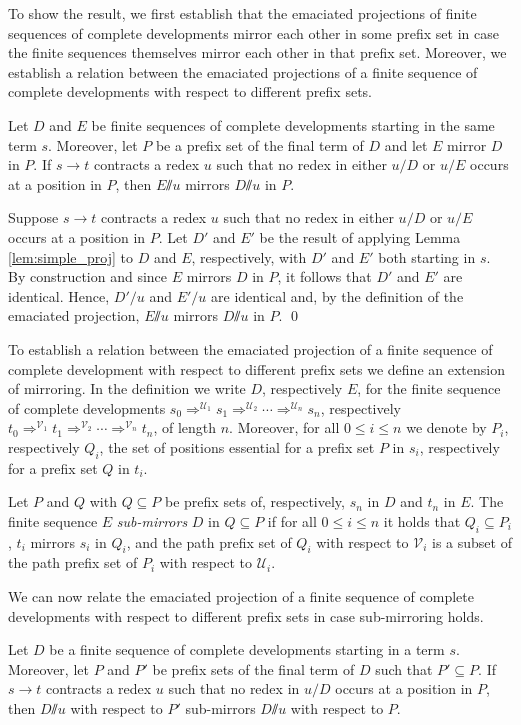 \documentclass{LMCS}
\theoremstyle{definition}
\newcommand{\rew}{\rightarrow}
\newcommand{\emmy}{\mathord{\sslash}}
\newcommand{\dev}{\Rightarrow}
\newcommand{\fscd}[3]{{#1}_0 \dev^{\mathcal{#2}_1} {#1}_1 \dev^{\mathcal{#2}_2} \cdots \dev^{\mathcal{#2}_{#3}} {#1}_{#3}}
\begin{document}
To show the result, we first establish that the emaciated projections of finite sequences of complete developments mirror each other in some prefix set in case the finite sequences themselves mirror each other in that prefix set. Moreover, we establish a relation between the emaciated projections of a finite sequence of complete developments with respect to different prefix sets.

\begin{lem}
\label{lem:nf_mirror}
Let $D$ and $E$ be finite sequences of complete developments starting in the same term $s$. Moreover, let $P$ be a prefix set of the final term of $D$ and let $E$ mirror $D$ in $P$. If $s \rew t$ contracts a redex $u$ such that no redex in either $u / D$ or $u / E$ occurs at a position in $P$, then $E \emmy u$ mirrors $D \emmy u$ in $P$.
\end{lem}

\proof
Suppose $s \rew t$ contracts a redex $u$ such that no redex in either $u / D$ or $u / E$ occurs at a position in $P$. Let $D'$ and $E'$ be the result of applying Lemma \ref{lem:simple_proj} to $D$ and $E$, respectively, with $D'$ and $E'$ both starting in $s$. By construction and since $E$ mirrors $D$ in $P$, it follows that $D'$ and $E'$ are identical. Hence, $D' / u$ and $E' / u$ are identical and, by the definition of the emaciated projection, $E \emmy u$ mirrors $D \emmy u$ in $P$.
\qed

To establish a relation between the emaciated projection of a finite sequence of complete development with respect to different prefix sets we define an extension of mirroring. In the definition we write $D$, respectively $E$, for the finite sequence of complete developments $\fscd{s}{U}{n}$, respectively $\fscd{t}{V}{n}$, of length $n$. Moreover, for all $0 \leq i \leq n$ we denote by $P_i$, respectively $Q_i$, the set of positions essential for a prefix set $P$ in $s_i$, respectively for a prefix set $Q$ in $t_i$.

\begin{defi}
Let $P$ and $Q$ with $Q \subseteq P$ be prefix sets of, respectively, $s_n$ in $D$ and $t_n$ in $E$. The finite sequence $E$ \emph{sub-mirrors} $D$ in $Q \subseteq P$ if for all $0 \leq i \leq n$ it holds that $Q_i \subseteq P_i$, $t_i$ mirrors $s_i$ in $Q_i$, and the path prefix set of $Q_i$ with respect to $\mathcal{V}_i$ is a subset of the path prefix set of $P_i$ with respect to $\mathcal{U}_i$.
\end{defi}

We can now relate the emaciated projection of a finite sequence of complete developments with respect to different prefix sets in case sub-mirroring holds.
\begin{lem}
\label{lem:nf_submirror}
Let $D$ be a finite sequence of complete developments starting in a term $s$. Moreover, let $P$ and $P'$ be prefix sets of the final term of $D$ such that $P' \subseteq P$. If $s \rew t$ contracts a redex $u$ such that no redex in $u / D$ occurs at a position in $P$, then $D \emmy u$ with respect to $P'$ sub-mirrors $D \emmy u$ with respect to $P$.
\end{lem}
\end{document}
